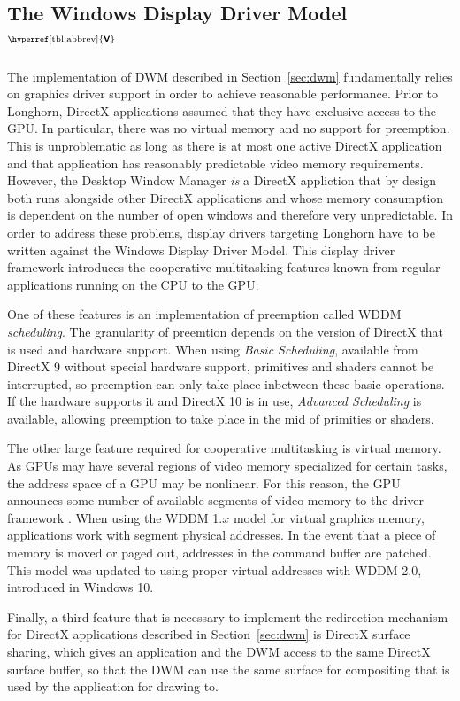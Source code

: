 \documentclass[10pt,twocolumn,a4paper]{article}
\newcommand{\bs}[1]{\textbf{\sffamily #1}}
\newcommand{\winver}[1]{$^{\text{\hyperref[tbl:abbrev]{\bs{#1}}}}$}
\newcommand{\winsubsection}[2]{\subsection[#1]{#1\winver{#2}}}
\begin{document}
		\winsubsection{The Windows Display Driver Mo\-del}{V}\label{sec:wddm}
			The implementation of DWM described in Section~\ref{sec:dwm}
			fundamentally relies on graphics driver support in order to achieve
			reasonable performance.  Prior to Longhorn, DirectX applications
			assumed that they have exclusive access to the GPU. In particular,
			there was no virtual memory and no support for preemption. This is
			unproblematic as long as there is at most one active DirectX application
			and that application has reasonably predictable video memory requirements.
			However, the Desktop Window Manager \emph{is} a DirectX appliction that
			by design both runs alongside other DirectX applications and whose
			memory consumption is dependent on the number of open windows and therefore
			very unpredictable.
			In order to address these problems, display drivers targeting Longhorn
			have to be written against the Windows Display Driver Model. This
			display driver framework introduces the cooperative multitasking
			features known from regular applications running on the CPU to the
			GPU. \cite{dwmwddm}

			One of these features is an implementation of preemption called
			WDDM \emph{scheduling}. The granularity of preemtion depends on
			the version of DirectX that is used and hardware support. When
			using \emph{Basic Scheduling}, available from DirectX 9 without
			special hardware support, primitives and shaders cannot be interrupted,
			so preemption can only take place inbetween these basic operations.
			If the hardware supports it and DirectX 10 is in use, \emph{Advanced
			Scheduling} is available, allowing preemption to take place in the mid
			of primities or shaders. \cite{dwmwddm}

			The other large feature required for cooperative multitasking is
			virtual memory. As GPUs may have several regions of video memory
			specialized for certain tasks, the address space of a GPU may
			be nonlinear. For this reason, the GPU announces some number of
			available segments of video memory to the driver framework \cite{gpuseg}.
			When using the WDDM 1.$x$ model for virtual graphics
			memory, applications work with segment physical addresses. In the event
			that a piece of memory is moved or paged out, addresses in the command
			buffer are patched. This model was updated to using proper virtual
			addresses with WDDM 2.0, introduced in Windows 10. \cite{wddm2}

			Finally, a third feature that is necessary to implement the redirection
			mechanism for DirectX applications described in Section~\ref{sec:dwm}
			is DirectX surface sharing, which gives an application and the DWM
			access to the same DirectX surface buffer, so that the DWM can use the
			same surface for compositing that is used by the application for
			drawing to. \cite{dwmredirect}
\end{document}
